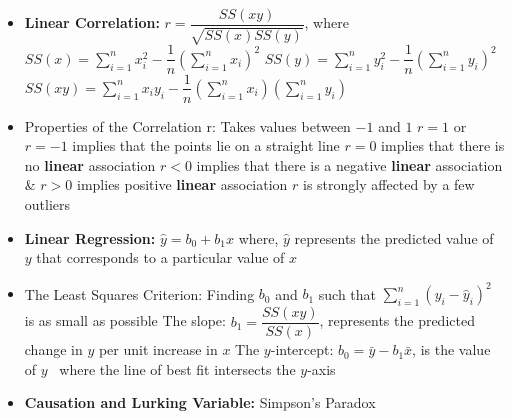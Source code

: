 \documentclass[twoside]{article}
\newcommand{\0}{\mathbf{0}}
\begin{document}
\begin{itemize}
\vspace{-1.2in}
\item \textbf{Linear Correlation:} $r=\dfrac{SS(xy)}{\sqrt{SS(x)SS(y)}}$, where
\subitem $SS(x)=\sum_{i=1}^nx_i^2-\dfrac{1}{n}\left(\sum_{i=1}^nx_i\right)^2$
\subitem $SS(y)=\sum_{i=1}^ny_i^2-\dfrac{1}{n}\left(\sum_{i=1}^ny_i\right)^2$
\subitem $SS(xy)=\sum_{i=1}^nx_iy_i-\dfrac{1}{n}\left(\sum_{i=1}^nx_i\right)\left(\sum_{i=1}^ny_i\right)$
\item Properties of the Correlation r:
\subitem Takes values between $-1$ and $1$
\subitem $r = 1$ or $r = -1$ implies that the points lie on a straight line
\subitem $r = 0$ implies that there is no \textbf{linear} association
\subitem $r < 0$ implies that there is a negative \textbf{linear} association \& $r > 0$ implies positive \textbf{linear} association
\subitem $r$ is strongly affected by a few outliers

\item \textbf{Linear Regression:} $\hat{y}=b_0+b_1x$
\subitem where, $\hat{y}$ represents the predicted value of $y$ that corresponds to a particular value of $x$
\item The Least Squares Criterion: Finding $b_0$ and $b_1$ such that $\sum_{i=1}^n(y_i-\hat{y}_i)^2$ is as small as possible
\subitem The slope: $b_1=\dfrac{SS(xy)}{SS(x)}$, represents the predicted change in $y$ per unit increase in $x$
\subitem The $y$-intercept: $b_0=\bar{y}-b_1\bar{x}$, is the value of $y$ \ where the line of best fit intersects the $y$-axis
\item \textbf{Causation and Lurking Variable:}
\subitem Simpson’s Paradox
\end{itemize}
\end{document}
